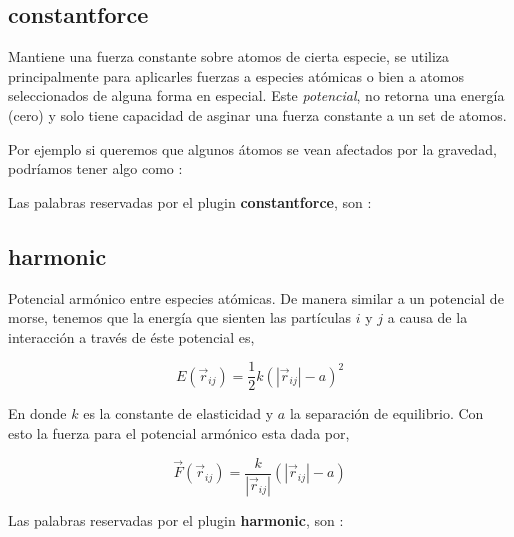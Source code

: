\subsection{constantforce}
Mantiene una fuerza constante sobre atomos de cierta especie, se utiliza principalmente para aplicarles fuerzas a especies at\'omicas o bien a atomos seleccionados de alguna forma en especial. Este \textit{potencial}, no retorna una energ\'ia (cero) y solo tiene capacidad de asginar una fuerza constante a un set de atomos.

Por ejemplo si queremos que algunos \'atomos se vean afectados por la gravedad, podr\'iamos tener algo como :


Las palabras reservadas por el plugin \textbf{constantforce}, son :


\subsection{harmonic}
Potencial arm\'onico entre especies at\'omicas. De manera similar a un potencial de morse, tenemos que la energ\'ia que sienten las part\'iculas $i$ y $j$ a causa de la interacci\'on a trav\'es de \'este potencial es,

$$E(\vec{r}_{ij}) = \frac{1}{2}k\left(|\vec{r}_{ij}|-a\right)^2$$

En donde $k$ es la constante de elasticidad y $a$ la separaci\'on de equilibrio. Con esto la fuerza para el potencial arm\'onico esta dada por,

$$\vec{F}(\vec{r}_{ij}) = \frac{k}{|\vec{r}_{ij}|}\left(|\vec{r}_{ij}|-a\right)$$

Las palabras reservadas por el plugin \textbf{harmonic}, son :


